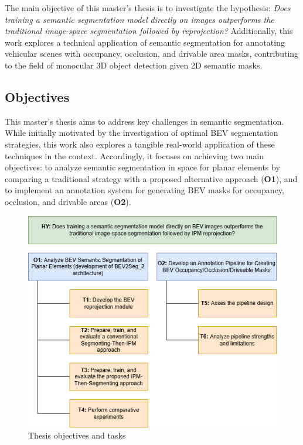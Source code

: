 The main objective of this master's thesis is to investigate the hypothesis: \textit{Does training a semantic segmentation model directly on  images outperforms the traditional image-space segmentation followed by  reprojection?} Additionally, this work explores a technical application of  semantic segmentation for annotating vehicular scenes with occupancy, occlusion, and drivable area masks, contributing to the field of monocular 3D object detection given 2D semantic masks.


\subsection{Objectives} \label{sec:objectives}
This master's thesis aims to address key challenges in  semantic segmentation. While initially motivated by the investigation of optimal BEV segmentation strategies, this work also explores a tangible real-world application of these techniques in the  context. Accordingly, it focuses on achieving two main objectives: to analyze semantic segmentation in  space for planar elements by comparing a traditional strategy with a proposed alternative approach (\textbf{O1}), and to implement an annotation system for generating BEV masks for occupancy, occlusion, and drivable areas (\textbf{O2}).

\begin{figure}[h!]
    \centering
    \includegraphics[width=0.8\linewidth]{./images/introduction/TFM_Objectives.png}
    \caption{Thesis objectives and tasks}
    \label{fig:objectives}
\end{figure}

